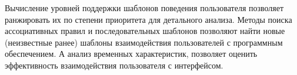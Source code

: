 Вычисление уровней поддержки шаблонов поведения пользователя позволяет ранжировать их по степени приоритета для детального анализа.
Методы поиска ассоциативных правил и последовательных шаблонов позволяют найти новые (неизвестные ранее) шаблоны взаимодействия пользователей с программным обеспечением.
А анализ временных характеристик, позволяет оценить эффективность взаимодействия пользователя с интерфейсом.